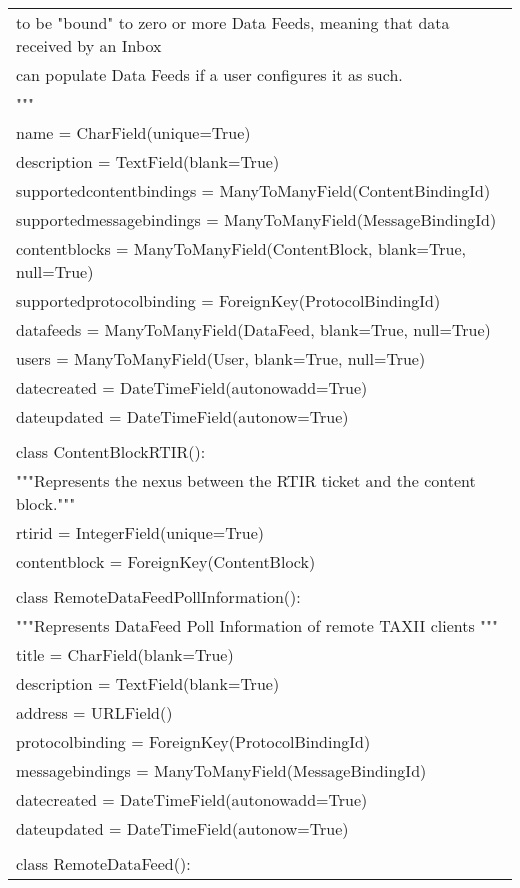 \begin{center}
\begin{longtable}{|l|}
	    to be "bound" to zero or more Data Feeds, meaning that data received by an Inbox\\
	    can populate Data Feeds if a user configures it as such.\\
	    """\\
	    name = CharField(unique=True)\\
	    description = TextField(blank=True)\\
	    supportedcontentbindings = ManyToManyField(ContentBindingId)\\
	    supportedmessagebindings = ManyToManyField(MessageBindingId)\\
	    contentblocks = ManyToManyField(ContentBlock, blank=True, null=True)\\
	    supportedprotocolbinding = ForeignKey(ProtocolBindingId)\\
	    datafeeds = ManyToManyField(DataFeed, blank=True, null=True)\\
	    users = ManyToManyField(User, blank=True, null=True)\\
	    datecreated = DateTimeField(autonowadd=True)\\
	    dateupdated = DateTimeField(autonow=True)\\
	\\
	class ContentBlockRTIR():\\
	    """Represents the nexus between the RTIR ticket and the content block."""\\
	    rtirid = IntegerField(unique=True)\\
	    contentblock = ForeignKey(ContentBlock)\\
	\\
	class RemoteDataFeedPollInformation():\\
	    """Represents DataFeed Poll Information of remote TAXII clients """\\
	    title = CharField(blank=True)\\
	    description = TextField(blank=True)\\
	    address = URLField()\\
	    protocolbinding = ForeignKey(ProtocolBindingId)\\
	    messagebindings = ManyToManyField(MessageBindingId)\\
	    datecreated = DateTimeField(autonowadd=True)\\
	    dateupdated = DateTimeField(autonow=True)\\
	\\
	class RemoteDataFeed():\\

\end{longtable}
\end{center}
